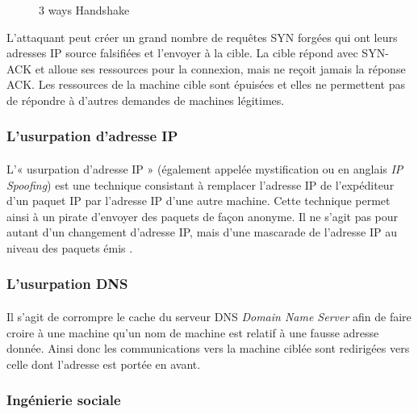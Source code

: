 	\begin{figure}[H]
	  \begin{center}
	  \end{center}
	  \caption[TCP handshake]{3 ways Handshake}
	  \label{Mécanisme d'établissement de connexion TCP}
	\end{figure}
	
	L'attaquant peut créer un grand nombre de requêtes SYN forgées qui ont leurs adresses IP source falsifiées et l'envoyer à la cible. La cible répond avec SYN-ACK et alloue ses ressources pour la connexion, mais ne reçoit jamais la réponse ACK. Les ressources de la machine cible sont épuisées et elles ne permettent pas de répondre à d'autres demandes de  machines légitimes.

	\subsubsection{L'usurpation d'adresse IP}
	  \paragraph{}
	    L'« usurpation d'adresse IP » (également appelée mystification ou en anglais \textit{IP Spoofing}) est une technique consistant à remplacer l'adresse IP de l'expéditeur d'un paquet IP par l'adresse IP d'une autre machine.
	    Cette technique permet ainsi à un pirate d'envoyer des paquets de façon anonyme. Il ne s'agit pas pour autant d'un changement d'adresse IP, mais d'une mascarade de l'adresse IP au niveau des paquets émis \cite{F}.

	\subsubsection{L'usurpation DNS}
	  \paragraph{}
	    Il s'agit de corrompre le cache du serveur DNS \textit{ Domain Name Server} afin de faire croire à une machine qu'un nom de machine est relatif à une fausse adresse donnée. Ainsi donc les communications vers la machine ciblée sont redirigées vers celle dont l'adresse est portée en avant.

	\subsubsection{Ingénierie sociale}
